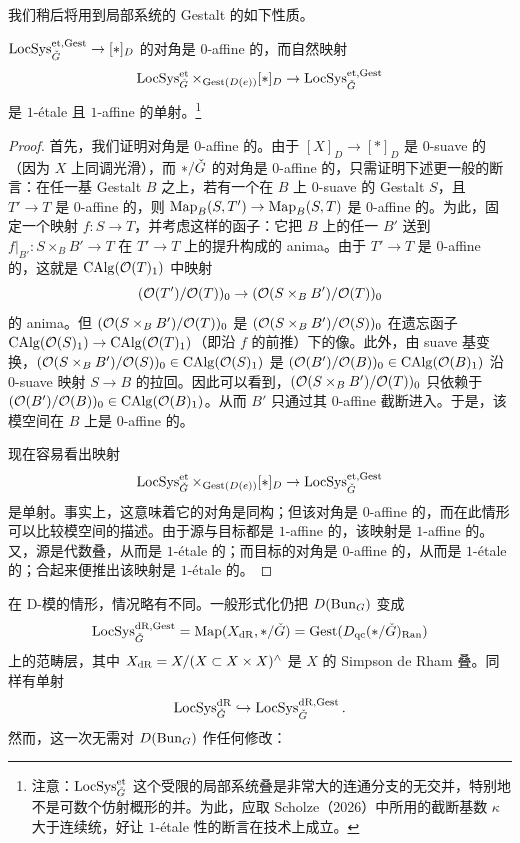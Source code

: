 我们稍后将用到局部系统的 Gestalt 的如下性质。

\begin{proposition}
$\operatorname{LocSys}^{\mathrm{et},\mathrm{Gest}}_{\check{G}}\to[\ast]_D$ 的对角是 $0$-affine 的，而自然映射
\[
\operatorname{LocSys}^{\mathrm{et}}_{\check{G}}\times_{\mathrm{Gest}(D(e))}[\ast]_D\to\operatorname{LocSys}^{\mathrm{et},\mathrm{Gest}}_{\check{G}}
\]
是 $1$-étale 且 $1$-affine 的单射。\footnote{注意：$\operatorname{LocSys}^{\mathrm{et}}_{\check{G}}$ 这个受限的局部系统叠是非常大的连通分支的无交并，特别地不是可数个仿射概形的并。为此，应取 Scholze（2026）中所用的截断基数 $\kappa$ 大于连续统，好让 $1$-étale 性的断言在技术上成立。}
\end{proposition}

\begin{proof}
首先，我们证明对角是 $0$-affine 的。由于 $[X]_D\to[\ast]_D$ 是 $0$-suave 的（因为 $X$ 上同调光滑），而 $\ast/\check{G}$ 的对角是 $0$-affine 的，只需证明下述更一般的断言：在任一基 Gestalt $B$ 之上，若有一个在 $B$ 上 $0$-suave 的 Gestalt $S$，且 $T'\to T$ 是 $0$-affine 的，则 $\operatorname{Map}_B(S,T')\to\operatorname{Map}_B(S,T)$ 是 $0$-affine 的。为此，固定一个映射 $f\colon S\to T$，并考虑这样的函子：它把 $B$ 上的任一 $B'$ 送到 $f|_{B'}\colon S\times_B B'\to T$ 在 $T'\to T$ 上的提升构成的 anima。由于 $T'\to T$ 是 $0$-affine 的，这就是 $\operatorname{CAlg}(\mathcal{O}(T)_1)$ 中映射
\[
(\mathcal{O}(T')/\mathcal{O}(T))_0\to(\mathcal{O}(S\times_B B')/\mathcal{O}(T))_0
\]
的 anima。但 $(\mathcal{O}(S\times_B B')/\mathcal{O}(T))_0$ 是 $(\mathcal{O}(S\times_B B')/\mathcal{O}(S))_0$ 在遗忘函子 $\operatorname{CAlg}(\mathcal{O}(S)_1)\to\operatorname{CAlg}(\mathcal{O}(T)_1)$（即沿 $f$ 的前推）下的像。此外，由 suave 基变换，$(\mathcal{O}(S\times_B B')/\mathcal{O}(S))_0\in\operatorname{CAlg}(\mathcal{O}(S)_1)$ 是 $(\mathcal{O}(B')/\mathcal{O}(B))_0\in\operatorname{CAlg}(\mathcal{O}(B)_1)$ 沿 $0$-suave 映射 $S\to B$ 的拉回。因此可以看到，$(\mathcal{O}(S\times_B B')/\mathcal{O}(T))_0$ 只依赖于 $(\mathcal{O}(B')/\mathcal{O}(B))_0\in\operatorname{CAlg}(\mathcal{O}(B)_1)$。从而 $B'$ 只通过其 $0$-affine 截断进入。于是，该模空间在 $B$ 上是 $0$-affine 的。

现在容易看出映射
\[
\operatorname{LocSys}^{\mathrm{et}}_{\check{G}}\times_{\mathrm{Gest}(D(e))}[\ast]_D\to\operatorname{LocSys}^{\mathrm{et},\mathrm{Gest}}_{\check{G}}
\]
是单射。事实上，这意味着它的对角是同构；但该对角是 $0$-affine 的，而在此情形可以比较模空间的描述。由于源与目标都是 $1$-affine 的，该映射是 $1$-affine 的。又，源是代数叠，从而是 $1$-étale 的；而目标的对角是 $0$-affine 的，从而是 $1$-étale 的；合起来便推出该映射是 $1$-étale 的。
\end{proof}

在 D-模的情形，情况略有不同。一般形式化仍把 $D(\operatorname{Bun}_G)$ 变成
\[
\operatorname{LocSys}^{\mathrm{dR},\mathrm{Gest}}_{\check{G}}=\operatorname{Map}(X_{\mathrm{dR}},\ast/\check{G})=\mathrm{Gest}(D_{\mathrm{qc}}(\ast/\check{G})_{\mathrm{Ran}})
\]
上的范畴层，其中 $X_{\mathrm{dR}}=X/(X\subset X\times X)^{\wedge}$ 是 $X$ 的 Simpson de Rham 叠。同样有单射
\[
\operatorname{LocSys}^{\mathrm{dR}}_{\check{G}}\hookrightarrow\operatorname{LocSys}^{\mathrm{dR},\mathrm{Gest}}_{\check{G}}.
\]
然而，这一次无需对 $D(\operatorname{Bun}_G)$ 作任何修改：

